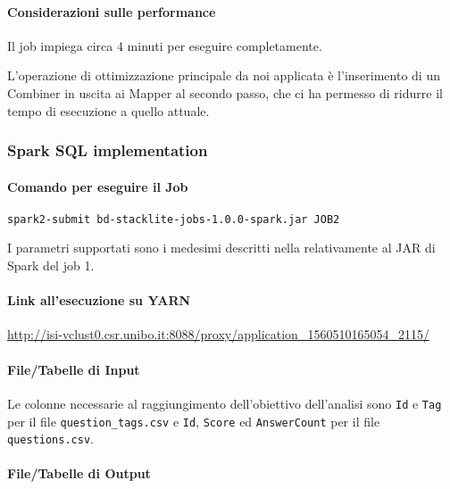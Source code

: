   \paragraph{Considerazioni sulle performance}\label{par:job2:mapreduce:performance}

  Il job impiega circa 4 minuti per eseguire completamente.

  L'operazione di ottimizzazione principale da noi applicata è l'inserimento di un Combiner in uscita ai Mapper al secondo passo,
  che ci ha permesso di ridurre il tempo di esecuzione a quello attuale.

  \subsubsection{Spark SQL implementation}\label{subsub:job2:spark}

  \paragraph{Comando per eseguire il Job}\label{par:job2:spark:cmd}

  \texttt{spark2-submit bd-stacklite-jobs-1.0.0-spark.jar JOB2}

  I parametri supportati sono i medesimi descritti nella  relativamente al JAR di Spark del job 1.

  \paragraph{Link all'esecuzione su YARN}\label{par:job2:spark:yarn}

  \url{http://isi-vclust0.csr.unibo.it:8088/proxy/application_1560510165054_2115/}

  \paragraph{File/Tabelle di Input}\label{par:job2:spark:input}

  Le colonne necessarie al raggiungimento dell'obiettivo dell'analisi sono \texttt{Id} e \texttt{Tag} per il file \texttt{question\_tags.csv}
  e \texttt{Id}, \texttt{Score} ed \texttt{AnswerCount} per il file \texttt{questions.csv}.

  \paragraph{File/Tabelle di Output}\label{par:job2:spark:output}

